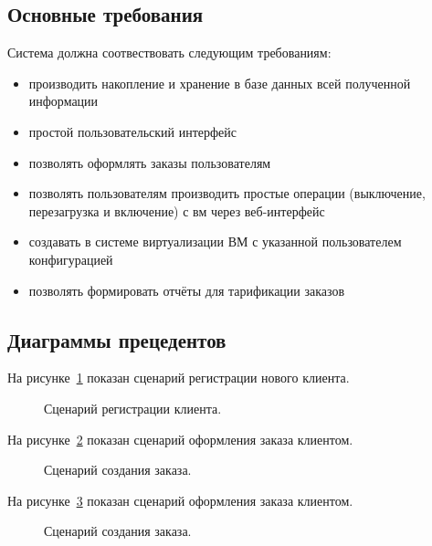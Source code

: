 \subsection{Основные требования}\label{sec:usecase_umls}
Система должна соотвествовать следующим требованиям:
\begin{itemize}
  \item производить накопление и хранение в базе данных всей полученной информации
  \item простой пользовательский интерфейс
  \item позволять оформлять заказы пользователям
  \item позволять пользователям производить простые операции (выключение, перезагрузка и включение) с вм через веб-интерфейс
  \item создавать в системе виртуализации ВМ с указанной пользователем конфигурацией
  \item позволять формировать отчёты для тарификации заказов
\end{itemize}

\subsection{Диаграммы прецедентов}\label{sec:usecase_umls}
На рисунке~\ref{fig:umls_register_ucesace} показан сценарий регистрации нового клиента.
\begin{figure}[ht]
  \caption{Сценарий регистрации клиента.}\label{fig:umls_register_ucesace}
\end{figure}

На рисунке~\ref{fig:umls_make_order_usecase} показан сценарий оформления заказа клиентом.
\begin{figure}[ht]
  \caption{Сценарий создания заказа.}\label{fig:umls_make_order_usecase}
\end{figure}

На рисунке~\ref{fig:umls_report_request_usecase} показан сценарий оформления заказа клиентом.
\begin{figure}[ht]
  \caption{Сценарий создания заказа.}\label{fig:umls_report_request_usecase}
\end{figure}

